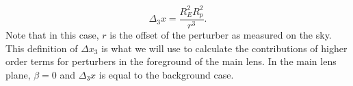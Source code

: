 \begin{equation}
\Delta_3 x = \frac{R_E^2 R_p^2}{r^3}.
\end{equation}
Note that in this case, $r$ is the offset of the perturber as measured on the sky. This definition of $\Delta x_3$ is what we will use to calculate the contributions of higher order terms for perturbers in the foreground of the main lens. In the main lens plane, $\beta = 0$ and $\Delta_3 x$ is equal to the background case.
  
  